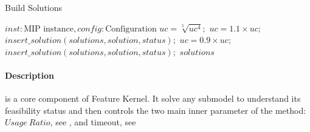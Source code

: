 \begin{algorithm}[H]
    \caption{Build Solutions}\label{algo:build-solutions}
    \begin{algorithmic}[1]
        \REQUIRE $inst: \text{MIP instance}, config: \text{Configuration}$
                \STATE $uc = \sqrt[5]{uc^4};$
                \STATE $uc = 1.1 \times uc;$
                \STATE $insert\_solution(solutions, solution, status);$
                \STATE $uc = 0.9 \times uc;$
                \STATE $insert\_solution(solutions, solution, status);$
                \ENDIF
            \ENDIF
        \ENDFOR
        \RETURN $solutions$
    \end{algorithmic}
\end{algorithm}

\paragraph{Description}  is a core component of Feature Kernel. It solve any submodel to understand its feasibility status and then controls 
the two main inner parameter of the method: $Usage\ Ratio$, see , and timeout, see 